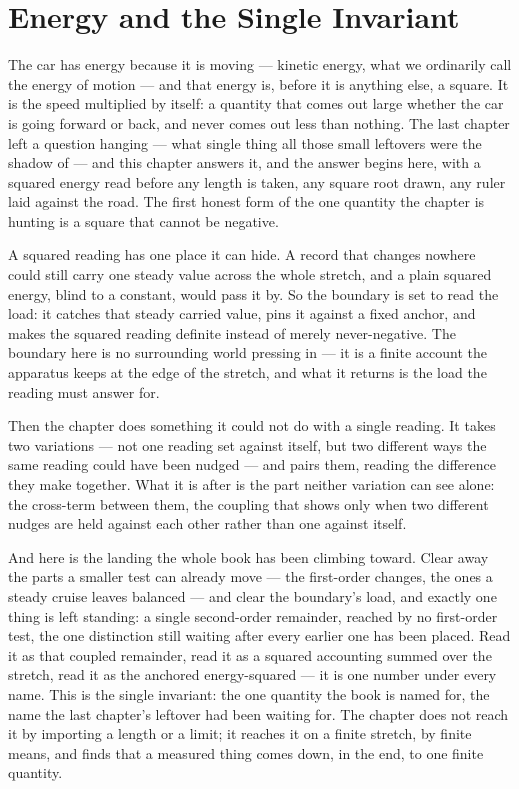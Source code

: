 \chapter{Energy and the Single Invariant}

The car has energy because it is moving --- kinetic energy, what we ordinarily call the energy of motion --- and that energy is, before it is anything else, a square. It is the speed multiplied by itself: a quantity that comes out large whether the car is going forward or back, and never comes out less than nothing. The last chapter left a question hanging --- what single thing all those small leftovers were the shadow of --- and this chapter answers it, and the answer begins here, with a squared energy read before any length is taken, any square root drawn, any ruler laid against the road. The first honest form of the one quantity the chapter is hunting is a square that cannot be negative.

A squared reading has one place it can hide. A record that changes nowhere could still carry one steady value across the whole stretch, and a plain squared energy, blind to a constant, would pass it by. So the boundary is set to read the load: it catches that steady carried value, pins it against a fixed anchor, and makes the squared reading definite instead of merely never-negative. The boundary here is no surrounding world pressing in --- it is a finite account the apparatus keeps at the edge of the stretch, and what it returns is the load the reading must answer for.

Then the chapter does something it could not do with a single reading. It takes two variations --- not one reading set against itself, but two different ways the same reading could have been nudged --- and pairs them, reading the difference they make together. What it is after is the part neither variation can see alone: the cross-term between them, the coupling that shows only when two different nudges are held against each other rather than one against itself.

And here is the landing the whole book has been climbing toward. Clear away the parts a smaller test can already move --- the first-order changes, the ones a steady cruise leaves balanced --- and clear the boundary's load, and exactly one thing is left standing: a single second-order remainder, reached by no first-order test, the one distinction still waiting after every earlier one has been placed. Read it as that coupled remainder, read it as a squared accounting summed over the stretch, read it as the anchored energy-squared --- it is one number under every name. This is the single invariant: the one quantity the book is named for, the name the last chapter's leftover had been waiting for. The chapter does not reach it by importing a length or a limit; it reaches it on a finite stretch, by finite means, and finds that a measured thing comes down, in the end, to one finite quantity.

